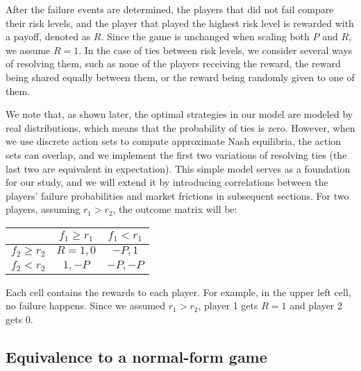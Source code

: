 \documentclass[preprint,12pt,authoryear]{elsarticle}
\theoremstyle{definition}
\begin{document}
After the failure events are determined, the players that did not fail compare their risk levels, and the player that played the highest risk level is rewarded with a payoff, denoted as $R$. Since the game is unchanged when scaling both $P$ and $R$, we assume $R = 1$. In the case of ties between risk levels, we consider several ways of resolving them, such as none of the players receiving the reward, the reward being shared equally between them, or the reward being randomly given to one of them.

We note that, as shown later, the optimal strategies in our model are modeled by real distributions, which means that the probability of ties is zero. However, when we use discrete action sets to compute approximate Nash equilibria, the action sets can overlap, and we implement the first two variations of resolving ties (the last two are equivalent in expectation). This simple model serves as a foundation for our study, and we will extend it by introducing correlations between the players' failure probabilities and market frictions in subsequent sections.
For two players, assuming $r_1 > r_2$, the outcome matrix will be:

\begin{center}
\begin{tabular}{|c|c|c|}
\cline{2-3}
\multicolumn{1}{c|}{} & $f_1\ge r_1$ & $f_1<r_1$ \\
\hline
$f_2\ge r_2$ & $R=1, 0$ & $-P, 1$ \\
\hline
$f_2<r_2$ & $1, -P$ &  $-P, -P$ \\
\hline
\end{tabular}
\end{center}


Each cell contains the rewards to each player. For example, in the upper left cell, no failure happens. Since we assumed $r_1 > r_2$, player 1 gets $R=1$ and player 2 gets $0$.

\subsection{Equivalence to a normal-form game}
\end{document}
